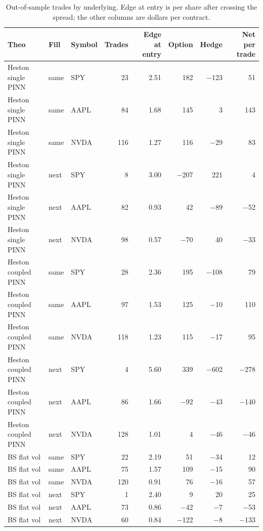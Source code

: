 \begin{table}[t]
\centering
\small
\caption{Out-of-sample trades by underlying. Edge at entry is per share after crossing the spread; the other columns are dollars per contract.}
\label{tab:decomp}
\begin{tabular}{lllrrrrr}
\toprule
Theo & Fill & Symbol & Trades & Edge at entry & Option & Hedge & Net per trade \\
\midrule
Heston single PINN & same & SPY & 23 & 2.51 & 182 & $-$123 & 51 \\
Heston single PINN & same & AAPL & 84 & 1.68 & 145 & 3 & 143 \\
Heston single PINN & same & NVDA & 116 & 1.27 & 116 & $-$29 & 83 \\
Heston single PINN & next & SPY & 8 & 3.00 & $-$207 & 221 & 4 \\
Heston single PINN & next & AAPL & 82 & 0.93 & 42 & $-$89 & $-$52 \\
Heston single PINN & next & NVDA & 98 & 0.57 & $-$70 & 40 & $-$33 \\
Heston coupled PINN & same & SPY & 28 & 2.36 & 195 & $-$108 & 79 \\
Heston coupled PINN & same & AAPL & 97 & 1.53 & 125 & $-$10 & 110 \\
Heston coupled PINN & same & NVDA & 118 & 1.23 & 115 & $-$17 & 95 \\
Heston coupled PINN & next & SPY & 4 & 5.60 & 339 & $-$602 & $-$278 \\
Heston coupled PINN & next & AAPL & 86 & 1.66 & $-$92 & $-$43 & $-$140 \\
Heston coupled PINN & next & NVDA & 128 & 1.01 & 4 & $-$46 & $-$46 \\
BS flat vol & same & SPY & 22 & 2.19 & 51 & $-$34 & 12 \\
BS flat vol & same & AAPL & 75 & 1.57 & 109 & $-$15 & 90 \\
BS flat vol & same & NVDA & 120 & 0.91 & 76 & $-$16 & 57 \\
BS flat vol & next & SPY & 1 & 2.40 & 9 & 20 & 25 \\
BS flat vol & next & AAPL & 73 & 0.86 & $-$42 & $-$7 & $-$53 \\
BS flat vol & next & NVDA & 60 & 0.84 & $-$122 & $-$8 & $-$133 \\
\bottomrule
\end{tabular}
\end{table}

